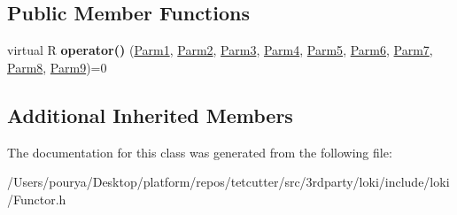 \subsection*{Public Member Functions}
\begin{DoxyCompactItemize}
\item 
\hypertarget{classLoki_1_1FunctorImpl_3_01R_00_01Seq_3_01P1_00_01P2_00_01P3_00_01P4_00_01P5_00_01P6_00_01P7_0a9743783bda060bdf3a291ac31cfafe2_a72985cd4af60d8668c296a153c6b1909}{}virtual R {\bfseries operator()} (\hyperlink{classLoki_1_1EmptyType}{Parm1}, \hyperlink{classLoki_1_1EmptyType}{Parm2}, \hyperlink{classLoki_1_1EmptyType}{Parm3}, \hyperlink{classLoki_1_1EmptyType}{Parm4}, \hyperlink{classLoki_1_1EmptyType}{Parm5}, \hyperlink{classLoki_1_1EmptyType}{Parm6}, \hyperlink{classLoki_1_1EmptyType}{Parm7}, \hyperlink{classLoki_1_1EmptyType}{Parm8}, \hyperlink{classLoki_1_1EmptyType}{Parm9})=0\label{classLoki_1_1FunctorImpl_3_01R_00_01Seq_3_01P1_00_01P2_00_01P3_00_01P4_00_01P5_00_01P6_00_01P7_0a9743783bda060bdf3a291ac31cfafe2_a72985cd4af60d8668c296a153c6b1909}

\end{DoxyCompactItemize}
\subsection*{Additional Inherited Members}


The documentation for this class was generated from the following file\+:\begin{DoxyCompactItemize}
\item 
/\+Users/pourya/\+Desktop/platform/repos/tetcutter/src/3rdparty/loki/include/loki/Functor.\+h\end{DoxyCompactItemize}
